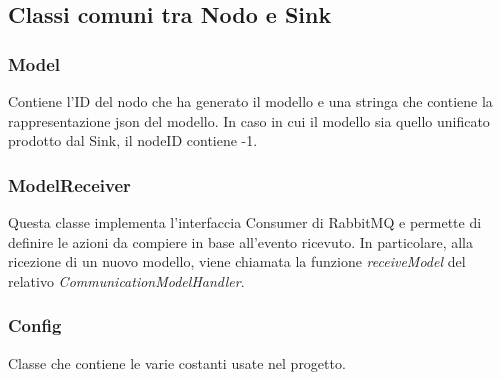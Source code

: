     \subsection{Classi comuni tra Nodo e Sink}
      \subsubsection{Model}
        Contiene l'ID del nodo che ha generato il modello e una stringa che contiene la rappresentazione json del modello. In caso in cui il modello sia quello unificato prodotto dal Sink, il nodeID contiene -1.
        

      \subsubsection{ModelReceiver}\label{ModelReceiver}
        Questa classe implementa l'interfaccia Consumer di RabbitMQ e permette di definire le azioni da compiere in base all'evento ricevuto. In particolare, alla ricezione di un nuovo modello, viene chiamata la funzione \textit{receiveModel} del relativo \textit{CommunicationModelHandler}.
        

      \subsubsection{Config}
        Classe che contiene le varie costanti usate nel progetto.
        

